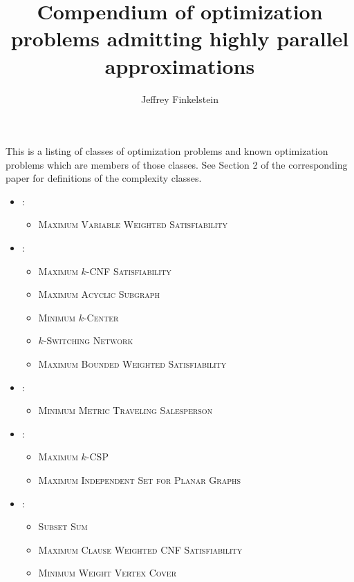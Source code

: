 \documentclass{article}
\title{Compendium of optimization problems admitting highly parallel approximations}
\author{Jeffrey Finkelstein}
\begin{document}
\maketitle

This is a listing of classes of optimization problems and known optimization problems which are members of those classes.
See Section 2 of the corresponding paper for definitions of the complexity classes.

\begin{itemize}
\item \NNCO:
  \begin{itemize}
  \item \textsc{Maximum Variable Weighted Satisfiability} \cite[Theorem~3.1]{om87} \cite[Theorem~8.3]{acgkmp99}
  \end{itemize}
\item \ApxNCO:
  \begin{itemize}
  \item \textsc{Maximum $k$-CNF Satisfiability} \cite[Theorem~8.6]{acgkmp99}
  \item \textsc{Maximum Acyclic Subgraph} \cite[Section~7.4]{dsst97}
  \item \textsc{Minimum $k$-Center} \cite[Section~7.4]{dsst97}
  \item \textsc{$k$-Switching Network} \cite[Section~7.4]{dsst97}
  \item \textsc{Maximum Bounded Weighted Satisfiability} \cite[Theorem~4]{sx95}
  \end{itemize}
\item \RNCAS:
  \begin{itemize}
  \item \textsc{Minimum Metric Traveling Salesperson} \cite[Theorem~7.1.1]{dsst97}
  \end{itemize}
\item \NCAS:
  \begin{itemize}
  \item \textsc{Maximum $k$-CSP} \cite[Corollary~13]{trevisan98}
  \item \textsc{Maximum Independent Set for Planar Graphs} \cite[Theorem 6.4.1]{dsst97}
  \end{itemize}
\item \FNCAS:
  \begin{itemize}
  \item \textsc{Subset Sum} \cite[Theorem~4.1.4]{dsst97}
  \item \textsc{Maximum Clause Weighted CNF Satisfiability} \cite[Theorem~8]{trevisan98}
  \item \textsc{Minimum Weight Vertex Cover} \cite[Theorem~5.3.6]{dsst97}

\end{itemize}
\end{itemize}
\end{document}
